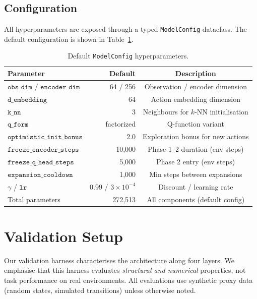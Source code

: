 \documentclass{article}
\begin{document}
\subsection{Configuration}

All hyperparameters are exposed through a typed \texttt{ModelConfig} dataclass.
The default configuration is shown in Table~\ref{tab:config}.

\begin{table}[h]
  \centering
  \caption{Default \texttt{ModelConfig} hyperparameters.}
  \label{tab:config}
  \begin{tabular}{lrc}
    \toprule
    \textbf{Parameter} & \textbf{Default} & \textbf{Description} \\
    \midrule
    $\texttt{obs\_dim}$ / $\texttt{encoder\_dim}$ & 64 / 256 &
      Observation / encoder dimension \\
    $\texttt{d\_embedding}$ & 64 & Action embedding dimension \\
    $\texttt{k\_nn}$ & 3 & Neighbours for $k$-NN initialisation \\
    $\texttt{q\_form}$ & factorized & Q-function variant \\
    $\texttt{optimistic\_init\_bonus}$ & 2.0 & Exploration bonus for new actions \\
    $\texttt{freeze\_encoder\_steps}$ & 10{,}000 & Phase 1--2 duration (env steps) \\
    $\texttt{freeze\_q\_head\_steps}$ & 5{,}000 & Phase 2 entry (env steps) \\
    $\texttt{expansion\_cooldown}$ & 1{,}000 & Min steps between expansions \\
    $\gamma$ / $\texttt{lr}$ & 0.99 / $3\times10^{-4}$ & Discount / learning rate \\
    Total parameters & 272{,}513 & All components (default config) \\
    \bottomrule
  \end{tabular}
\end{table}


\section{Validation Setup}
\label{sec:setup}

Our validation harness characterises the architecture along four layers. We
emphasise that this harness evaluates \emph{structural and numerical}
properties, not task performance on real environments. All evaluations use
synthetic proxy data (random states, simulated transitions) unless otherwise
noted.
\end{document}
